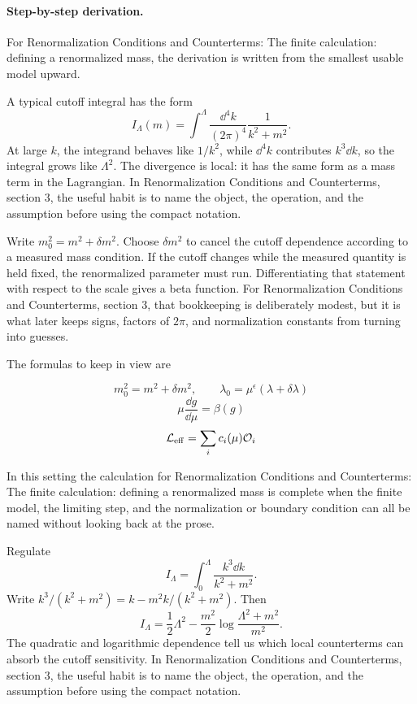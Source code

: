 \paragraph{Step-by-step derivation.}

For Renormalization Conditions and Counterterms: The finite calculation: defining a renormalized mass, the derivation is written from the smallest usable model upward.

A typical cutoff integral has the form
\[
  I_\Lambda(m)=\int^{\Lambda}\frac{\dd^4k}{(2\pi)^4}\frac{1}{k^2+m^2}.
\]
At large \(k\), the integrand behaves like \(1/k^2\), while \(\dd^4k\) contributes \(k^3\dd k\), so the integral grows like \(\Lambda^2\).  The divergence is local: it has the same form as a mass term in the Lagrangian.  In Renormalization Conditions and Counterterms, section 3, the useful habit is to name the object, the operation, and the assumption before using the compact notation.

Write \(m_0^2=m^2+\delta m^2\).  Choose \(\delta m^2\) to cancel the cutoff dependence according to a measured mass condition.  If the cutoff changes while the measured quantity is held fixed, the renormalized parameter must run.  Differentiating that statement with respect to the scale gives a beta function.  For Renormalization Conditions and Counterterms, section 3, that bookkeeping is deliberately modest, but it is what later keeps signs, factors of \(2\pi\), and normalization constants from turning into guesses.

The formulas to keep in view are

\[
  m_0^2=m^2+\delta m^2,\qquad \lambda_0=\mu^\epsilon(\lambda+\delta\lambda)
\]
\[
  \mu\frac{\dd g}{\dd\mu}=\beta(g)
\]
\[
  \mathcal L_{\mathrm{eff}}=\sum_i c_i(\mu)\mathcal O_i
\]

In this setting the calculation for Renormalization Conditions and Counterterms: The finite calculation: defining a renormalized mass is complete when the finite model, the limiting step, and the normalization or boundary condition can all be named without looking back at the prose.




\begin{example}
Regulate
\[
  I_\Lambda=\int_0^\Lambda\frac{k^3\dd k}{k^2+m^2}.
\]
Write \(k^3/(k^2+m^2)=k-m^2k/(k^2+m^2)\).  Then
\[
  I_\Lambda=\frac12\Lambda^2-\frac{m^2}{2}\log\frac{\Lambda^2+m^2}{m^2}.
\]
The quadratic and logarithmic dependence tell us which local counterterms can absorb the cutoff sensitivity.  In Renormalization Conditions and Counterterms, section 3, the useful habit is to name the object, the operation, and the assumption before using the compact notation.
\end{example}




